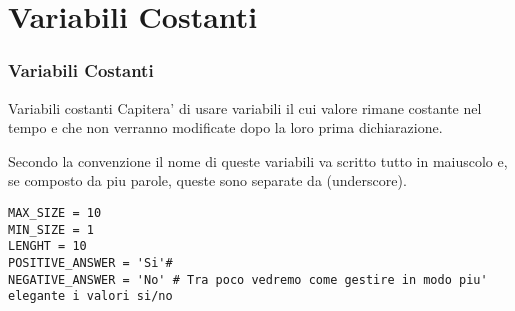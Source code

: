 \section{Variabili Costanti}

\begin{frame}[fragile]
\frametitle{Variabili Costanti}
    \begin{block}{Variabili costanti}
Capitera' di usare variabili il cui valore rimane costante nel tempo e che non verranno modificate dopo la loro prima dichiarazione.

Secondo la convenzione il nome di queste variabili va scritto tutto in maiuscolo e, se composto da piu parole, queste sono separate da \textunderscore (underscore).
    \end{block}
    
    \begin{lstlisting}
MAX_SIZE = 10
MIN_SIZE = 1
LENGHT = 10
POSITIVE_ANSWER = 'Si'# 
NEGATIVE_ANSWER = 'No' # Tra poco vedremo come gestire in modo piu' elegante i valori si/no
    \end{lstlisting}

\end{frame}
